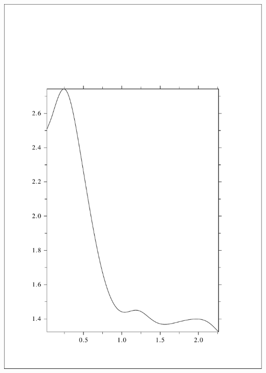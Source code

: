 \documentclass [11pt,spanish]{article}
\begin{document}
\includegraphics[scale=0.4]{RES_1s_tt1abspi2.pdf}
\end{document}
